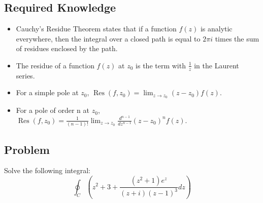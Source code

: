 \documentclass[12pt]{article}
\newcommand{\Res}{\operatorname{Res}}
\begin{document}
\subsection{Required Knowledge}
\begin{itemize}
    \item Cauchy's Residue Theorem states that if a function $f(z)$ is analytic everywhere, then the integral over a closed path is equal to $2\pi i$ times the sum of residues enclosed by the path.
    \item The residue of a function $f(z)$ at $z_0$ is the term with $\frac{1}{z}$ in the Laurent series.
    \item For a simple pole at $z_0$, $\Res(f,z_0)=\lim_{z\to z_0}(z-z_0)f(z)$.
    \item For a pole of order n at $z_0$, $\Res(f,z_0)=\frac{1}{(n-1)!}\lim_{z\to z_0}\frac{d^{n-1}}{dz^{n-1}}(z-z_0)^nf(z)$.
\end{itemize}
\subsection{Problem}
Solve the following integral:
\begin{equation}
	\oint_C (z^2+3+\frac{(z^2+1)e^z}{(z+i)(z-1)^3}dz)
\end{equation}
\end{document}
